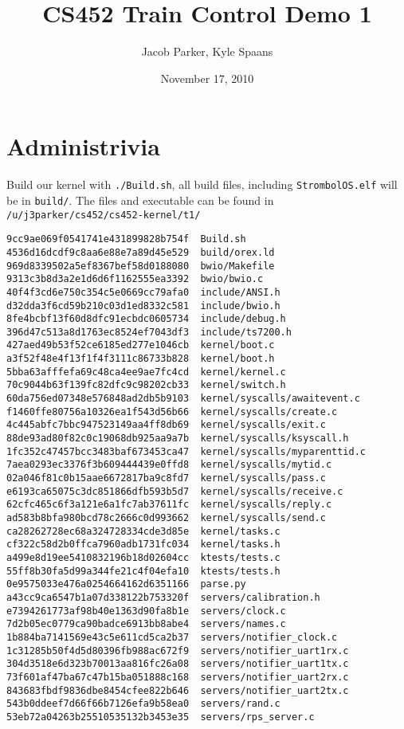 \documentclass{article}
\title{CS452 Train Control Demo 1}
\date{November 17, 2010}
\author{Jacob Parker, Kyle Spaans}
\begin{document}
\maketitle

\section{Administrivia}
Build our kernel with \texttt{./Build.sh}, all build files, including
\texttt{StrombolOS.elf} will be in \texttt{build/}. The files and executable can
be found in \texttt{/u/j3parker/cs452/cs452-kernel/t1/}
\begin{verbatim}
9cc9ae069f0541741e431899828b754f  Build.sh
4536d16dcdf9c8aa6e88e7a89d45e529  build/orex.ld
969d8339502a5ef8367bef58d0188080  bwio/Makefile
9313c3b8d3a2e1d6d6f1162555ea3392  bwio/bwio.c
40f4f3cd6e750c354c5e0669cc79afa0  include/ANSI.h
d32dda3f6cd59b210c03d1ed8332c581  include/bwio.h
8fe4bcbf13f60d8dfc91ecbdc0605734  include/debug.h
396d47c513a8d1763ec8524ef7043df3  include/ts7200.h
427aed49b53f52ce6185ed277e1046cb  kernel/boot.c
a3f52f48e4f13f1f4f3111c86733b828  kernel/boot.h
5bba63afffefa69c48ca4ee9ae7fc4cd  kernel/kernel.c
70c9044b63f139fc82dfc9c98202cb33  kernel/switch.h
60da756ed07348e576848ad2db5b9103  kernel/syscalls/awaitevent.c
f1460ffe80756a10326ea1f543d56b66  kernel/syscalls/create.c
4c445abfc7bbc947523149aa4ff8db69  kernel/syscalls/exit.c
88de93ad80f82c0c19068db925aa9a7b  kernel/syscalls/ksyscall.h
1fc352c47457bcc3483baf673453ca47  kernel/syscalls/myparenttid.c
7aea0293ec3376f3b609444439e0ffd8  kernel/syscalls/mytid.c
02a046f81c0b15aae6672817ba9c8fd7  kernel/syscalls/pass.c
e6193ca65075c3dc851866dfb593b5d7  kernel/syscalls/receive.c
62cfc465c6f3a121e6a1fc7ab37611fc  kernel/syscalls/reply.c
ad583b8bfa980bcd78c2666c0d993662  kernel/syscalls/send.c
ca28262728ec68a324728334cde3d85e  kernel/tasks.c
cf322c58d2b0ffca7960adb1731fc034  kernel/tasks.h
a499e8d19ee5410832196b18d02604cc  ktests/tests.c
55ff8b30fa5d99a344fe21c4f04efa10  ktests/tests.h
0e9575033e476a0254664162d6351166  parse.py
a43cc9ca6547b1a07d338122b753320f  servers/calibration.h
e7394261773af98b40e1363d90fa8b1e  servers/clock.c
7d2b05ec0779ca90badce6913bb8abe4  servers/names.c
1b884ba7141569e43c5e611cd5ca2b37  servers/notifier_clock.c
1c31285b50f4d5d80396fb988ac672f9  servers/notifier_uart1rx.c
304d3518e6d323b70013aa816fc26a08  servers/notifier_uart1tx.c
73f601af47ba67c47b15ba051888c168  servers/notifier_uart2rx.c
843683fbdf9836dbe8454cfee822b646  servers/notifier_uart2tx.c
543b0ddeef7d66f66b7126efa9b58ea0  servers/rand.c
53eb72a04263b25510535132b3453e35  servers/rps_server.c

\end{verbatim}
\end{document}

